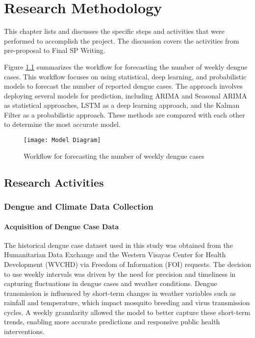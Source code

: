 \chapter{Research Methodology}
This chapter lists and discusses the specific steps and activities that  were  performed  to accomplish the project. 
The discussion covers the activities from pre-proposal to Final SP Writing.


Figure \ref{fig:data_summarized_snippet} summarizes the workflow for forecasting the number of weekly dengue cases. This workflow focuses on using statistical, deep learning, and probabilistic models to forecast the number of reported dengue cases. The approach involves deploying several models for prediction, including ARIMA and Seasonal ARIMA as statistical approaches, LSTM as a deep learning approach, and the Kalman Filter as a probabilistic approach. These methods are compared with each other to determine the most accurate model.

\begin{figure}[ht]
	\centering
	\texttt{[image: Model Diagram]}
	\caption{Workflow for forecasting the number of weekly dengue cases}
	\label{fig:data_summarized_snippet}
\end{figure}

\section{Research Activities}

\subsection{Dengue and Climate Data Collection}

\subsubsection{Acquisition of Dengue Case Data}
The historical dengue case dataset used in this study was obtained from the Humanitarian Data Exchange and the Western Visayas Center for Health Development (WVCHD) via Freedom of Information (FOI) requests. The decision to use weekly intervals was driven by the need for precision and timeliness in capturing fluctuations in dengue cases and weather conditions. Dengue transmission is influenced by short-term changes in weather variables such as rainfall and temperature, which impact mosquito breeding and virus transmission cycles. A weekly granularity allowed the model to better capture these short-term trends, enabling more accurate predictions and responsive public health interventions.

